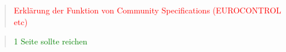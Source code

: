 \begin{quote}
\textcolor{red}{Erklärung der Funktion von Community Specifications (EUROCONTROL etc)}
\end{quote}
\begin{quote}
\textcolor{green}{1 Seite sollte reichen}
\end{quote}

